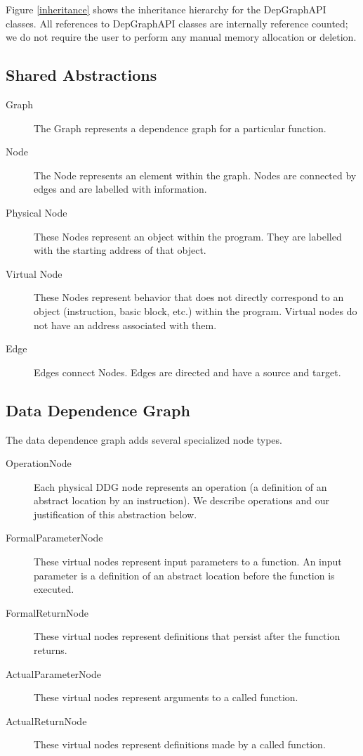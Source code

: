 \documentclass[12pt]{article}
\begin{document}
Figure \ref{inheritance} shows the
inheritance hierarchy for the DepGraphAPI classes. All references to
DepGraphAPI classes are internally reference counted; we do not
require the user to perform any manual memory allocation or deletion.

\subsection{Shared Abstractions}

\begin{description}
\item[Graph] The Graph represents a dependence graph for a particular
function.
\item[Node] The Node represents an element within the graph. Nodes are
connected by edges and are labelled with information.
\item[Physical Node] These Nodes represent an object within the
program. They are labelled with the starting address of that object.
\item[Virtual Node] These Nodes represent behavior that does not
directly correspond to an object (instruction, basic block, etc.)
within the program. Virtual nodes do not have an address associated
with them.
\item[Edge] Edges connect Nodes. Edges are directed and have a source
and target.
\end{description}

\subsection{Data Dependence Graph}

The data dependence graph adds several specialized node types.

\begin{description}
\item[OperationNode] Each physical
DDG node represents an operation (a definition of an abstract location
by an instruction). We describe operations and our justification of
this abstraction below.  
\item[FormalParameterNode] These virtual nodes
represent input parameters to a function. An input parameter is a
definition of an abstract location before the function is executed.
\item[FormalReturnNode] These virtual nodes represent definitions that
persist after the function returns.  
\item[ActualParameterNode] These
virtual nodes represent arguments to a called function.
\item[ActualReturnNode] These virtual nodes represent definitions made by a
called function. 
\end{description}
\end{document}
